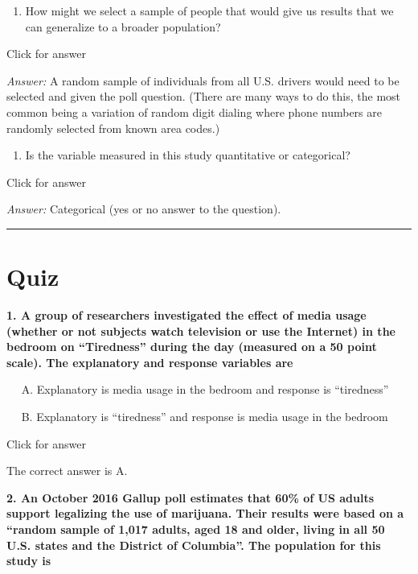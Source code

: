 \documentclass[
]{book}
\providecommand{\tightlist}{%
  \setlength{\itemsep}{0pt}\setlength{\parskip}{0pt}}
\begin{document}
\begin{enumerate}
\def\labelenumi{\alph{enumi}.}
\setcounter{enumi}{2}
\tightlist
\item
  How might we select a sample of people that would give us results that we can generalize to a broader population?
\end{enumerate}

Click for answer

\emph{Answer:} A random sample of individuals from all U.S. drivers would need to be selected and given the poll question. (There are many ways to do this, the most common being a variation of random digit dialing where phone numbers are randomly selected from known area codes.)

\begin{enumerate}
\def\labelenumi{\alph{enumi}.}
\setcounter{enumi}{3}
\tightlist
\item
  Is the variable measured in this study quantitative or categorical?
\end{enumerate}

Click for answer

\emph{Answer:} Categorical (yes or no answer to the question).

\begin{center}\rule{0.5\linewidth}{0.5pt}\end{center}

\hypertarget{quiz-1}{%
\section{Quiz}\label{quiz-1}}

\textbf{1. A group of researchers investigated the effect of media usage (whether or not subjects watch television or use the Internet) in the bedroom on ``Tiredness'' during the day (measured on a 50 point scale). The explanatory and response variables are}

  A. Explanatory is media usage in the bedroom and response is ``tiredness''

  B. Explanatory is ``tiredness'' and response is media usage in the bedroom

Click for answer

The correct answer is A.

\textbf{2. An October 2016 Gallup poll estimates that 60\% of US adults support legalizing the use of marijuana. Their results were based on a ``random sample of 1,017 adults, aged 18 and older, living in all 50 U.S. states and the District of Columbia''. The population for this study is}
\end{document}
